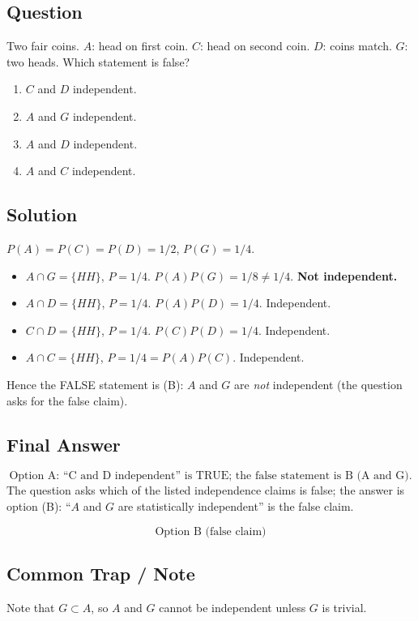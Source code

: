 \documentclass[11pt]{article}
\begin{document}
\subsection*{Question}
Two fair coins. $A$: head on first coin. $C$: head on second coin. $D$: coins match. $G$: two heads. Which statement is false?
\begin{enumerate}[label=(\Alph*)]
\item $C$ and $D$ independent.
\item $A$ and $G$ independent.
\item $A$ and $D$ independent.
\item $A$ and $C$ independent.
\end{enumerate}

\subsection*{Solution}
$P(A) = P(C) = P(D) = 1/2$, $P(G) = 1/4$.
\begin{itemize}[leftmargin=*]
\item $A\cap G = \{HH\}$, $P = 1/4$. $P(A)P(G) = 1/8 \ne 1/4$. \textbf{Not independent.}
\item $A\cap D = \{HH\}$, $P = 1/4$. $P(A)P(D) = 1/4$. Independent.
\item $C\cap D = \{HH\}$, $P = 1/4$. $P(C)P(D) = 1/4$. Independent.
\item $A\cap C = \{HH\}$, $P = 1/4 = P(A)P(C)$. Independent.
\end{itemize}
Hence the FALSE statement is (B): $A$ and $G$ are \emph{not} independent (the question asks for the false claim).

\subsection*{Final Answer}
\[
\boxed{\text{Option A: ``C and D independent'' is TRUE; the false statement is B (A and G).}}
\]
The question asks which of the listed independence claims is false; the answer is option (B): ``$A$ and $G$ are statistically independent'' is the false claim.

\[
\boxed{\text{Option B (false claim)}}
\]

\subsection*{Common Trap / Note}
Note that $G \subset A$, so $A$ and $G$ cannot be independent unless $G$ is trivial.
\end{document}
